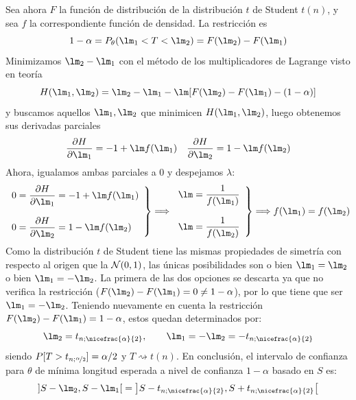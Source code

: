 \documentclass[12pt]{article}
\begin{document}
\begin{ejercicio}[1.85 puntos]
\begin{enumerate}[label=\alph*)]
            Sea ahora $F$ la función de distribución de la distribución $t$ de Student $t(n)$, 
            y sea $f$ la correspondiente función de densidad. La restricción es 
            $$1 - \alpha = P_\theta(\lm_1 < T < \lm_2) = F(\lm_2) - F(\lm_1)$$
            Minimizamos $\lm_2 - \lm_1$ con el método de los multiplicadores de Lagrange visto en teoría
            $$H(\lm_1, \lm_2) = \lm_2 - \lm_1 - \lm[F(\lm_2) - F(\lm_1) - (1-\alpha)]$$
            y buscamos aquellos $\lm_1, \lm_2$ que minimicen $H(\lm_1, \lm_2)$, luego obtenemos sus derivadas parciales
            $$\dfrac{\partial H}{\partial \lm_1} = - 1 + \lm f(\lm_1) \quad 
            \dfrac{\partial H}{\partial \lm_2} = 1 - \lm f(\lm_2)$$
            Ahora, igualamos ambas parciales a $0$ y despejamos $\lambda$:
            \begin{equation*}
                \left.\begin{array}{l}
                    0 = \dfrac{\partial H}{\partial \lm_1} = -1+\lm f(\lm_1) \\\\
                    0 = \dfrac{\partial H}{\partial \lm_2} = 1-\lm f(\lm_2)
                \end{array}\right\} \Longrightarrow \left.\begin{array}{l}
                    \lm = \dfrac{1}{f(\lm_1)} \\\\
                    \lm = \dfrac{1}{f(\lm_2)}
                \end{array}\right\} \Longrightarrow f(\lm_1) = f(\lm_2)
            \end{equation*}
            Como la distribución $t$ de Student tiene las mismas propiedades de simetría 
            con respecto al origen que la $\mathcal{N}(0, 1)$, las únicas posibilidades son o bien 
            $\lm_1 = \lm_2$ o bien $\lm_1 = -\lm_2$. La primera de las dos opciones se descarta ya que no verifica la restricción ($F(\lm_2) - F(\lm_1) = 0 \neq 1-\alpha$), 
            por lo que tiene que ser $\lm_1 = -\lm_2$. Teniendo nuevamente en cuenta la restricción $F(\lm_2) - F(\lm_1) = 1-\alpha$, estos quedan determinados por:
            \begin{equation*}
                \lm_2 = t_{n; \nicefrac{\alpha}{2}}, \qquad \lm_1 = -\lm_2 = -t_{n; \nicefrac{\alpha}{2}}
            \end{equation*}
            siendo $P[T > t_{n; \nicefrac{\alpha}{2}}] = \alpha/2$ y $T \rightsquigarrow t(n)$.
            En conclusión, el intervalo de confianza para $\theta$ de mínima longitud esperada a nivel de confianza $1-\alpha$ basado en $S$ es:
            \begin{equation*}
                \left] S - \lm_2, S - \lm_1 \right[ = \left] S - t_{n; \nicefrac{\alpha}{2}}, S + t_{n; \nicefrac{\alpha}{2}} \right[
            \end{equation*}

        \end{enumerate}
    \end{ejercicio}
\end{document}
